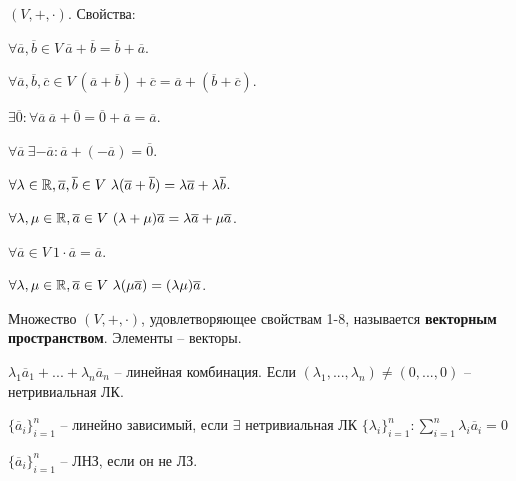 	$(V, +, \cdot)$. Свойства:
	\begin{MyList}
		\item $\forall \overline{a}, \overline{b} \in V \ \overline{a} + \overline{b} = \overline{b} + \overline{a}$.
		\item $\forall \overline{a}, \overline{b}, \overline{c} \in V \ (\overline{a} + \overline{b}) + \overline{c} = \overline{a} + (\overline{b} + \overline{c})$.
		\item $\exists \overline{0} : \forall \overline{a} \ \overline{a} + \overline{0} = \overline{0} + \overline{a} = \overline{a}$.
		\item $\forall \overline{a} \ \exists -\overline{a} : \overline{a} + (-\overline{a}) = \overline{0}$.
		\item $\forall \lambda \in \mathbb{R}, \overline{a}, \overline{b} \in V \ \lambda(\overline{a} + \overline{b}) = \lambda \overline{a} + \lambda \overline{b}$.
		\item $\forall \lambda, \mu \in \mathbb{R}, \overline{a} \in V \ (\lambda + \mu) \overline{a} = \lambda \overline{a} + \mu \overline{a}$.
		\item $\forall \overline{a} \in V \ 1 \cdot \overline{a} = \overline{a}$.
		\item $\forall \lambda, \mu \in \mathbb{R}, \overline{a} \in V \ \lambda(\mu \overline{a}) = (\lambda \mu) \overline{a}$.
	\end{MyList} 

	\begin{Def}
		Множество $(V, +, \cdot)$, удовлетворяющее свойствам 1-8, называется \textbf{векторным пространством}. Элементы -- векторы.
	\end{Def}


	\begin{Def}
		$\lambda_1 \overline{a}_1 + ... + \lambda_n \overline{a}_n$ -- линейная комбинация. Если $(\lambda_1, ..., \lambda_n) \neq (0, ..., 0)$ -- нетривиальная ЛК.  
	\end{Def}

	\begin{Def}
		$\{\overline{a}_i\}_{i = 1}^n$ -- линейно зависимый, если $\exists$ нетривиальная ЛК $\{\lambda_i\}_{i = 1}^n : \sum_{i = 1}^n \lambda_i \overline{a}_i = 0$   
	\end{Def}

	\begin{Def}
		$\{\overline{a}_i\}_{i = 1}^n$ -- ЛНЗ, если он не ЛЗ. 
	\end{Def}

